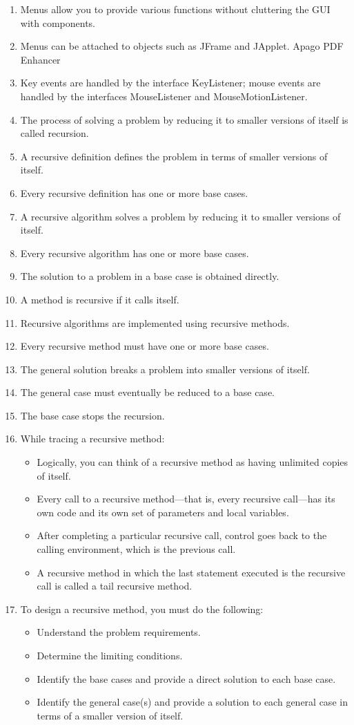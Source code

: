\documentclass[12pt,a4paper,final,twoside,onecolumn,titlepage]{book}
\begin{document}
\begin{enumerate}
\item Menus allow you to provide various functions without cluttering the GUI with components.
\item Menus can be attached to objects such as JFrame and JApplet. Apago PDF Enhancer
\item Key events are handled by the interface KeyListener; mouse events are handled by the interfaces MouseListener and MouseMotionListener.
\item The process of solving a problem by reducing it to smaller versions of itself is called recursion.
\item A recursive definition defines the problem in terms of smaller versions of itself.
\item Every recursive definition has one or more base cases.
\item A recursive algorithm solves a problem by reducing it to smaller versions of itself.
\item Every recursive algorithm has one or more base cases.
\item The solution to a problem in a base case is obtained directly.
\item A method is recursive if it calls itself.
\item Recursive algorithms are implemented using recursive methods.
\item Every recursive method must have one or more base cases.
\item The general solution breaks a problem into smaller versions of itself.
\item The general case must eventually be reduced to a base case.
\item The base case stops the recursion.
\item While tracing a recursive method:
\begin{itemize}
\item Logically, you can think of a recursive method as having unlimited copies of itself.
\item Every call to a recursive method—that is, every recursive call—has its own code and its own set of parameters and local variables.
\item After completing a particular recursive call, control goes back to the calling environment, which is the previous call. 
\item A recursive method in which the last statement executed is the recursive call is called a tail recursive method.
\end{itemize}
\item To design a recursive method, you must do the following:
\begin{itemize}
\item Understand the problem requirements.
\item Determine the limiting conditions.
\item Identify the base cases and provide a direct solution to each base case.
\item Identify the general case(s) and provide a solution to each general case in terms of a smaller version of itself.
\end{itemize}
\end{enumerate}
\end{document}
